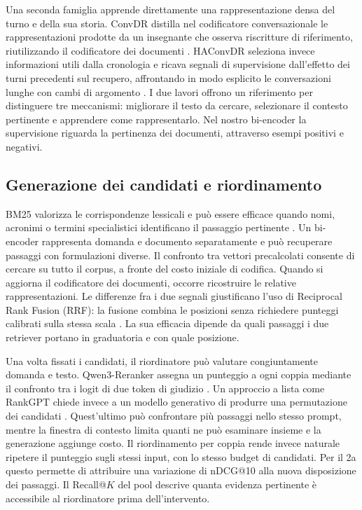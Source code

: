 Una seconda famiglia apprende direttamente una rappresentazione densa del turno e della sua storia. ConvDR distilla nel codificatore conversazionale le rappresentazioni prodotte da un insegnante che osserva riscritture di riferimento, riutilizzando il codificatore dei documenti \cite{convdr}. HAConvDR seleziona invece informazioni utili dalla cronologia e ricava segnali di supervisione dall'effetto dei turni precedenti sul recupero, affrontando in modo esplicito le conversazioni lunghe con cambi di argomento \cite{haconvdr}. I due lavori offrono un riferimento per distinguere tre meccanismi: migliorare il testo da cercare, selezionare il contesto pertinente e apprendere come rappresentarlo. Nel nostro bi-encoder la supervisione riguarda la pertinenza dei documenti, attraverso esempi positivi e negativi.

\subsection{Generazione dei candidati e riordinamento}
BM25 valorizza le corrispondenze lessicali e può essere efficace quando nomi, acronimi o termini specialistici identificano il passaggio pertinente \cite{bm25}. Un bi-encoder rappresenta domanda e documento separatamente e può recuperare passaggi con formulazioni diverse. Il confronto tra vettori precalcolati consente di cercare su tutto il corpus, a fronte del costo iniziale di codifica. Quando si aggiorna il codificatore dei documenti, occorre ricostruire le relative rappresentazioni. Le differenze fra i due segnali giustificano l'uso di Reciprocal Rank Fusion (RRF): la fusione combina le posizioni senza richiedere punteggi calibrati sulla stessa scala \cite{rrf}. La sua efficacia dipende da quali passaggi i due retriever portano in graduatoria e con quale posizione.

Una volta fissati i candidati, il riordinatore può valutare congiuntamente domanda e testo. Qwen3-Reranker assegna un punteggio a ogni coppia mediante il confronto tra i logit di due token di giudizio \cite{qwen}. Un approccio a lista come RankGPT chiede invece a un modello generativo di produrre una permutazione dei candidati \cite{rankgpt}. Quest'ultimo può confrontare più passaggi nello stesso prompt, mentre la finestra di contesto limita quanti ne può esaminare insieme e la generazione aggiunge costo. Il riordinamento per coppia rende invece naturale ripetere il punteggio sugli stessi input, con lo stesso budget di candidati. Per il 2a questo permette di attribuire una variazione di nDCG@10 alla nuova disposizione dei passaggi. Il Recall@$K$ del pool descrive quanta evidenza pertinente è accessibile al riordinatore prima dell'intervento.

